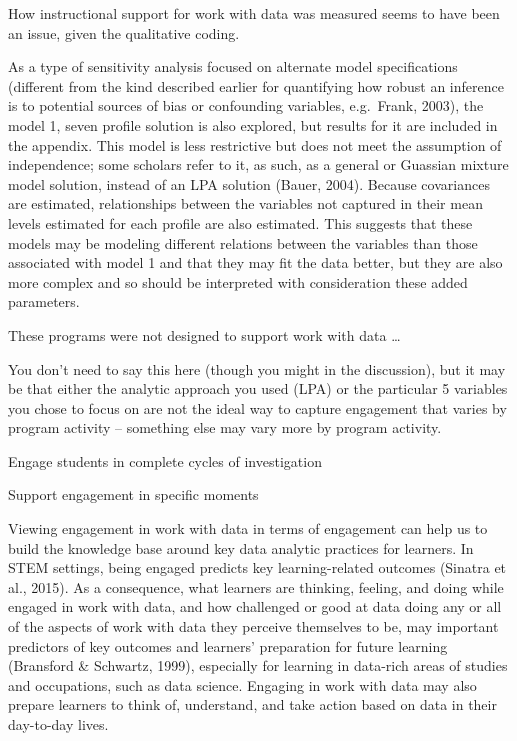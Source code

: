 \documentclass[]{book}
\theoremstyle{definition}
\theoremstyle{definition}
\theoremstyle{definition}
\theoremstyle{remark}
\begin{document}
How instructional support for work with data was measured seems to have
been an issue, given the qualitative coding.

As a type of sensitivity analysis focused on alternate model
specifications (different from the kind described earlier for
quantifying how robust an inference is to potential sources of bias or
confounding variables, e.g.~Frank, 2003), the model 1, seven profile
solution is also explored, but results for it are included in the
appendix. This model is less restrictive but does not meet the
assumption of independence; some scholars refer to it, as such, as a
general or Guassian mixture model solution, instead of an LPA solution
(Bauer, 2004). Because covariances are estimated, relationships between
the variables not captured in their mean levels estimated for each
profile are also estimated. This suggests that these models may be
modeling different relations between the variables than those associated
with model 1 and that they may fit the data better, but they are also
more complex and so should be interpreted with consideration these added
parameters.

These programs were not designed to support work with data \ldots{}

You don't need to say this here (though you might in the discussion),
but it may be that either the analytic approach you used (LPA) or the
particular 5 variables you chose to focus on are not the ideal way to
capture engagement that varies by program activity -- something else may
vary more by program activity.

Engage students in complete cycles of investigation

Support engagement in specific moments

Viewing engagement in work with data in terms of engagement can help us
to build the knowledge base around key data analytic practices for
learners. In STEM settings, being engaged predicts key learning-related
outcomes (Sinatra et al., 2015). As a consequence, what learners are
thinking, feeling, and doing while engaged in work with data, and how
challenged or good at data doing any or all of the aspects of work with
data they perceive themselves to be, may important predictors of key
outcomes and learners' preparation for future learning (Bransford \&
Schwartz, 1999), especially for learning in data-rich areas of studies
and occupations, such as data science. Engaging in work with data may
also prepare learners to think of, understand, and take action based on
data in their day-to-day lives.
\end{document}
